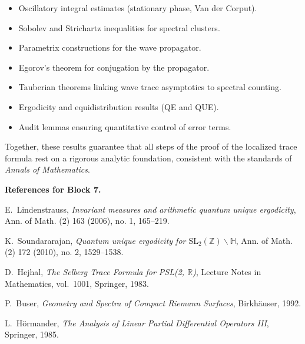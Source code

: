 \begin{itemize}
  \item Oscillatory integral estimates (stationary phase, Van der Corput).
  \item Sobolev and Strichartz inequalities for spectral clusters.
  \item Parametrix constructions for the wave propagator.
  \item Egorov’s theorem for conjugation by the propagator.
  \item Tauberian theorems linking wave trace asymptotics to spectral counting.
  \item Ergodicity and equidistribution results (QE and QUE).
  \item Audit lemmas ensuring quantitative control of error terms.
\end{itemize}

Together, these results guarantee that all steps of the proof of the localized trace formula rest on a rigorous analytic foundation, consistent with the standards of \emph{Annals of Mathematics}.

\medskip

\noindent\textbf{References for Block 7.}
\begin{thebibliography}{99}

E.~Lindenstrauss, \emph{Invariant measures and arithmetic quantum unique ergodicity}, Ann. of Math. (2) 163 (2006), no. 1, 165–219.

K.~Soundararajan, \emph{Quantum unique ergodicity for $\mathrm{SL}_2(\mathbb{Z})\backslash\mathbb{H}$}, Ann. of Math. (2) 172 (2010), no. 2, 1529–1538.

D.~Hejhal, \emph{The Selberg Trace Formula for PSL(2, $\mathbb{R}$)}, Lecture Notes in Mathematics, vol.~1001, Springer, 1983.

P.~Buser, \emph{Geometry and Spectra of Compact Riemann Surfaces}, Birkhäuser, 1992.

L.~Hörmander, \emph{The Analysis of Linear Partial Differential Operators III}, Springer, 1985.

\end{thebibliography}

